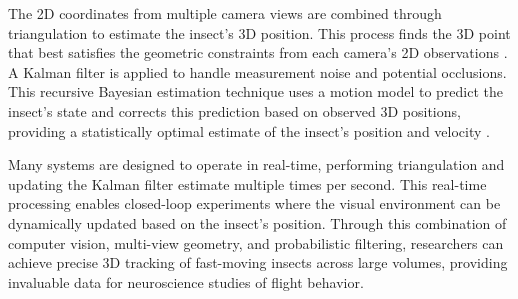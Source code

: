 \documentclass[../main/thesis_msc.tex]{subfiles}
\begin{document}
	The 2D coordinates from multiple camera views are combined through triangulation to estimate the insect's 3D position. This process finds the 3D point that best satisfies the geometric constraints from each camera's 2D observations \autocite{straw_multi-camera_2011}. A Kalman filter is applied to handle measurement noise and potential occlusions. This recursive Bayesian estimation technique uses a motion model to predict the insect's state and corrects this prediction based on observed 3D positions, providing a statistically optimal estimate of the insect's position and velocity \autocite{straw_multi-camera_2011}.

	Many systems are designed to operate in real-time, performing triangulation and updating the Kalman filter estimate multiple times per second. This real-time processing enables closed-loop experiments where the visual environment can be dynamically updated based on the insect's position. Through this combination of computer vision, multi-view geometry, and probabilistic filtering, researchers can achieve precise 3D tracking of fast-moving insects across large volumes, providing invaluable data for neuroscience studies of flight behavior.
\end{document}
